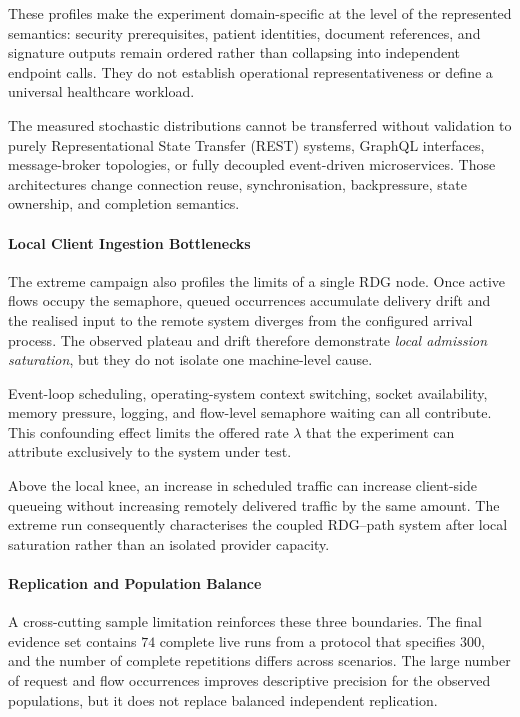 \noindent These profiles make the experiment domain-specific at the level of the
represented semantics: security prerequisites, patient identities, document
references, and signature outputs remain ordered rather than collapsing into
independent endpoint calls. They do not establish operational
representativeness or define a universal healthcare workload.

\noindent The measured stochastic distributions cannot be transferred without
validation to purely Representational State Transfer (REST) systems, GraphQL
interfaces, message-broker topologies, or fully decoupled event-driven
microservices. Those architectures change connection reuse, synchronisation,
backpressure, state ownership, and completion semantics.

\paragraph{Local Client Ingestion Bottlenecks}
\noindent The extreme campaign also profiles the limits of a single RDG node.
Once active flows occupy the semaphore, queued occurrences accumulate delivery
drift and the realised input to the remote system diverges from the configured
arrival process. The observed plateau and drift therefore demonstrate
\emph{local admission saturation}, but they do not isolate one machine-level
cause.

\noindent Event-loop scheduling, operating-system context switching, socket
availability, memory pressure, logging, and flow-level semaphore waiting can all
contribute. This confounding effect limits the offered rate $\lambda$ that the
experiment can attribute exclusively to the system under test.

\noindent Above the local knee, an increase in scheduled traffic can increase
client-side queueing without increasing remotely delivered traffic by the same
amount. The extreme run consequently characterises the coupled RDG--path
system after local saturation rather than an isolated provider capacity.

\paragraph{Replication and Population Balance}
\noindent A cross-cutting sample limitation reinforces these three boundaries. The final
evidence set contains $74$ complete live runs from a protocol that specifies
$300$, and the number of complete repetitions differs across scenarios. The
large number of request and flow occurrences improves descriptive precision for
the observed populations, but it does not replace balanced independent
replication.

